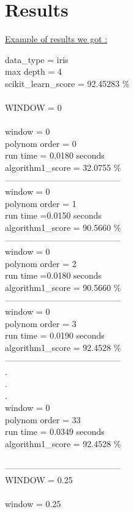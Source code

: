 \documentclass{article}
\begin{document}
\newpage
\section{Results}
\underline{\large{Example of results we got :}}
\begin{multicols}{2}
data\_type = iris\\
max depth = 4\\
scikit\_learn\_score = 92.45283 \% \\\\
WINDOW = 0 \\\\
window = 0\\
polynom order = 0\\
run time = 0.0180 seconds\\
algorithm1\_score = 32.0755 \%\\
-----------------------------------------\\
window = 0\\
polynom order = 1\\
run time =0.0150 seconds\\
algorithm1\_score = 90.5660 \%\\
-----------------------------------------\\
window = 0\\
polynom order = 2\\
run time =0.0180 seconds\\
algorithm1\_score = 90.5660 \%\\
-----------------------------------------\\
window = 0 \\
polynom order = 3\\
run time = 0.0190 seconds\\
algorithm1\_score = 92.4528 \%\\
-----------------------------------------\\
.\\
.\\
.\\
window = 0\\
polynom order = 33\\
run time = 0.0349 seconds\\
algorithm1\_score = 92.4528 \% \\\\
-----------------------------------------\\
WINDOW = 0.25\\\\
window = 0.25\\

\end{multicols}
\end{document}

